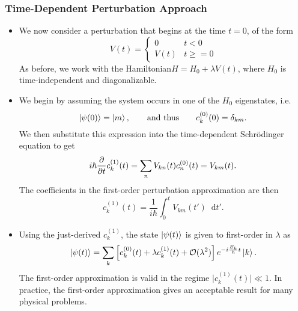 \documentclass[11pt, a4paper]{article}
\newcommand{\diff}{\mathop{}\!\mathrm{d}} %
\newcommand{\Schro}{Schr\"{o}dinger\xspace}
\newcommand{\Ham}{Hamiltonian\xspace}
\begin{document}
\subsubsection{Time-Dependent Perturbation Approach}
\begin{itemize}
    \item We now consider a perturbation that begins at the time $ t = 0 $, of the form
    \begin{equation*}
        V(t) = 
        \begin{cases}
            0 & t < 0\\
            V(t) & t \geq = 0
        \end{cases}
    \end{equation*}
    As before, we work with the \Ham $  H = H_{0} + \lambda V(t) $, where $ H_{0} $ is time-independent and diagonalizable. 

    \item We begin by assuming the system occurs in one of the $ H_{0} $ eigenstates, i.e. 
    \begin{equation*}
        \ket{\psi(0)} = \ket{m}, \qquad \text{and thus} \qquad  c_{k}^{(0)}(0) = \delta_{km}.
    \end{equation*}
    We then substitute this expression into the time-dependent \Schro equation to get
    \begin{equation*}
        i \hbar \pdv{t}c_{k}^{(1)}(t) = \sum_{n} V_{kn}(t)c_{n}^{(0)}(t) = V_{km}(t).
    \end{equation*}
    The coefficients in the first-order perturbation approximation are then 
    \begin{equation*}
        c_{k}^{(1)}(t) = \frac{1}{i \hbar} \int_{0}^{t}V_{km}(t')\diff t'.
    \end{equation*}
    
    \item Using the just-derived $ c_{k}^{(1)} $, the state $ \ket{\psi(t)} $ is given to first-order in $ \lambda $ as
    \begin{equation*}
        \ket{\psi(t)} = \sum_{k}\left[ c_{k}^{(0)}(t) + \lambda c_{k}^{(1)}(t) + \mathcal{O}(\lambda^{2})\right]e^{-i \frac{E_{k}}{\hbar}t}\ket{k}.
    \end{equation*}
    The first-order approximation is valid in the regime $ \big| c_{k}^{(1)}(t) \big| \ll 1 $. In practice, the first-order approximation gives an acceptable result for many physical problems.
    
    
\end{itemize}
\end{document}
